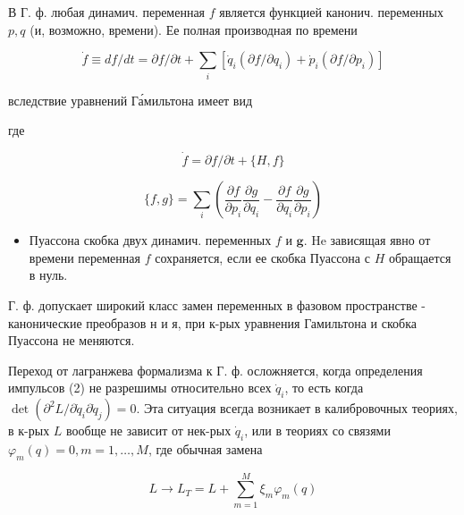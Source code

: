\documentclass[10pt]{article}
\begin{document}
В Г. ф. любая динамич. переменная $f$ является функцией канонич. переменных $p, q$ (и, возможно, времени). Ее полная производная по времени



\[

\dot{f} \equiv d f / d t=\partial f / \partial t+\sum_{i}\left[\dot{q}_{i}\left(\partial f / \partial q_{i}\right)+\dot{p}_{i}\left(\partial f / \partial p_{i}\right)\right]

\]



вследствие уравнений Га́мильтона имеет вид



где



\[

\dot{f}=\partial f / \partial t+\{H, f\}

\]



\[

\{f, g\}=\sum_{i}\left(\frac{\partial f}{\partial p_{i}} \frac{\partial g}{\partial q_{i}}-\frac{\partial f}{\partial q_{i}} \frac{\partial g}{\partial p_{i}}\right)

\]



\begin{itemize}

  \item Пуассона скобка двух динамич. переменных $f$ и $\boldsymbol{g}$. He зависящая явно от времени переменная $f$ сохраняется, если ее скобка Пуассона с $H$ обращается в нуль.

\end{itemize}



Г. ф. допускает широкий класс замен переменных в фазовом пространстве - канонические преобразов н и я, при к-рых уравнения Гамильтона и скобка Пуассона не меняются.



Переход от лагранжева формализма к Г. ф. осложняется, когда определения импульсов (2) не разрешимы относительно всех $\dot{q}_{i}$, то есть когда $\operatorname{det}\left(\partial^{2} L / \partial \dot{q}_{i} \partial \dot{q}_{j}\right)=0$. Эта ситуация всегда возникает в калибровочных теориях, в к-рых $L$ вообще не зависит от нек-рых $\dot{q}_{i}$, или в теориях со связями $\varphi_{m}(q)=0, m=1, \ldots, M$, где обычная замена



\[

L \rightarrow L_{T}=L+\sum_{m=1}^{M} \xi_{m} \varphi_{m}(q)

\]
\end{document}
